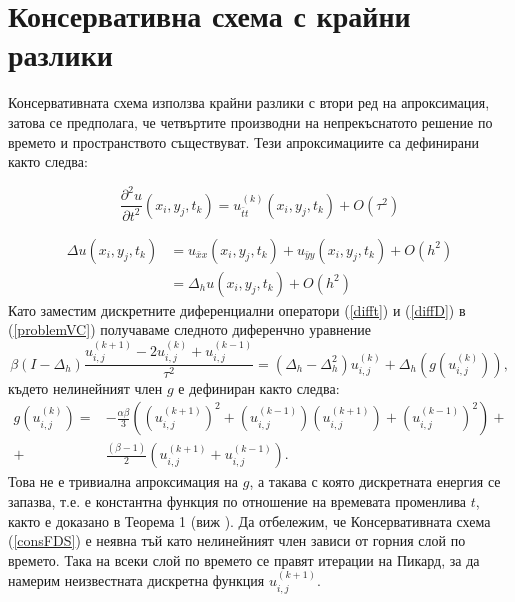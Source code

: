 \documentclass{article}
\newcommand{\be}{\begin{equation}}
\newcommand{\ee}{\end{equation}}
\newcommand{\rf}[1]{(\ref{#1})}
\begin{document}
\section{ Консервативна схема с крайни разлики }

Консервативната схема използва крайни разлики с втори ред на апроксимация, затова се предполага, че четвъртите производни на непрекъснатото решение по времето и пространството съществуват.  Тези апроксимациите са дефинирани както следва:

\be\label{difft}
\frac{\partial^2 u}{\partial t^2}(x_i, y_j, t_k ) = u^{(k)}_{\bar{t}t}(x_i, y_j, t_k ) + O(\tau^2) 
\ee

\begin{align}\label{diffD}
\Delta u(x_i, y_j, t_k )  &= u_{\bar{x}x}(x_i, y_j, t_k ) +  u_{\bar{y}y}(x_i, y_j, t_k ) +  O(h^2)  \nonumber\\
			      &= \Delta_h u(x_i, y_j, t_k ) +  O(h^2) 
\end{align}
Като заместим дискретните диференциални оператори \rf{difft} и \rf{diffD} в \rf{problemVC} получаваме следното диференчно уравнение
\be\label{consFDS}
\beta (I-\Delta_h)\frac{ u^{(k+1)}_{i, j} - 2u^{(k)}_{i,j} + u^{(k-1)}_{i,j} }{\tau^2} = (\Delta_h - \Delta_h^2)u^{(k)}_{i,j} + \Delta_h(g(u^{(k)}_{i,j})),
\ee
%
където нелинейният член $g$ е дефиниран както следва:
\begin{align}
g(u^{(k)}_{i,j})=& -\frac{\alpha \beta} { 3 } \left( (u^{(k+1)}_{i,j})^2 + (u^{(k-1)}_{i,j})(u^{(k+1)}_{i,j}) + (u^{(k-1)}_{i,j})^2 \right) + \nonumber\\
+&\frac{ (\beta - 1 )}{ 2 }\left( u^{(k+1)}_{i,j} + u^{(k-1)}_{i,j} \right).
\end{align}
Това не е тривиална апроксимация на $g$, а такава с която дискретната енергия се запазва, т.е. е константна функция по отношение на времевата променлива $t$, както е доказано в Теорема 1 (виж \cite{ref20}). Да отбележим, че Консервативната схема \rf{consFDS} е неявна тъй като нелинейният член зависи от горния слой по времето. Така на всеки слой по времето се правят итерации на Пикард, за да намерим неизвестната дискретна функция $u^{(k+1)}_{i,j}$.
\end{document}
